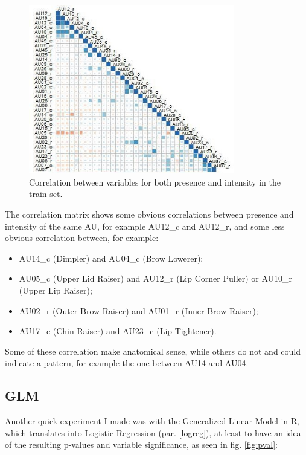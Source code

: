 \begin{figure}[H]
	\centering
	\includegraphics[width=0.8\textwidth]{images/correlation_matrix}
	\caption{Correlation between variables for both presence and intensity in the train set.}
	\label{fig:correlation_matrix}
\end{figure}

The correlation matrix shows some obvious correlations between presence and intensity of the same AU, for example AU12\_c and AU12\_r, and some less obvious correlation between, for example:
\begin{itemize}
	\item AU14\_c (Dimpler) and AU04\_c (Brow Lowerer);
	\item AU05\_c (Upper Lid Raiser) and AU12\_r (Lip Corner Puller) or AU10\_r (Upper Lip Raiser);
	\item AU02\_r (Outer Brow Raiser) and AU01\_r (Inner Brow Raiser);
	\item AU17\_c (Chin Raiser) and AU23\_c (Lip Tightener).
\end{itemize}

Some of these correlation make anatomical sense, while others do not and could indicate a pattern, for example the one between AU14 and AU04.

\clearpage

\subsection{GLM} \label{GLM}
Another quick experiment I made was with the Generalized Linear Model in R, which translates into Logistic Regression (par. \ref{logreg}), at least to have an idea of the resulting p-values and variable significance, as seen in fig. \ref{fig:pval}:

